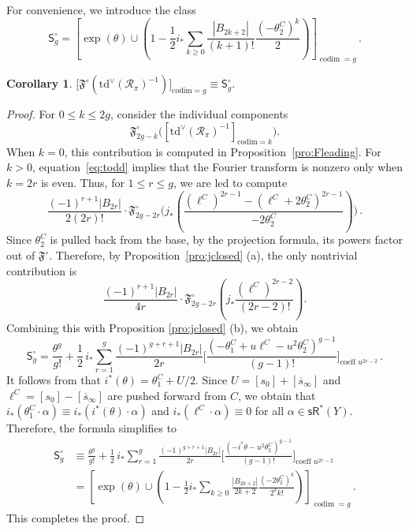 \documentclass[11pt]{article}
\def\sR{\mathsf{sR}}
\def\codim{\mathrm{codim}}
\def\Td{\mathrm{td}}
\def\fm{\mathfrak{F}}
\def\cR{\mathcal{R}}
\newcommand{\sfS}{\mathsf{S}}
\newcommand{\sbar}{\overline{s}}
\theoremstyle{definition}
\newtheorem{corollary}[definition]{Corollary}
\begin{document}
For convenience, we introduce the class
\[
\sfS_g^\circ = \left[ \exp(\theta) \cup \left(1 - \frac{1}{2}i_*\sum_{k\geq 0}\frac{|B_{2k+2}|}{(k+1)!}\frac{(-\theta_2^C)^k}{2}\right)\right]_{\operatorname{codim}=g}\,.
\]
\begin{corollary}\label{cor:Fleading2}
    $\big[\fm^\circ(\Td^\vee(\cR_\pi)^{-1})\big]_{\codim =g} \equiv \sfS_g^\circ$.
\end{corollary}
\begin{proof}
    For $0 \le k \le 2g$, consider the individual components
    \[
    \fm^\circ_{2g-k}\Big([\Td^\vee(\cR_\pi)^{-1}]_{\codim = k}\Big).
    \]
    When $k = 0$, this contribution is computed in Proposition~\ref{pro:Fleading}. For $k > 0$, equation~\eqref{eq:todd} implies that the Fourier transform is nonzero only when $k = 2r$ is even. Thus, for $1 \le r \le g$, we are led to compute
    \[
    \frac{(-1)^{r+1}|B_{2r}|}{2(2r)!} \cdot \fm^\circ_{2g-2r}\Bigg(j_*\!\left(
    \frac{(\ell^C)^{2r-1} - (\ell^C + 2\theta_2^C)^{2r-1}}{-2\theta_2^C}\right)\Bigg)\,.
    \]
    Since $\theta_2^C$ is pulled back from the base, by the projection formula, its powers factor out of $\fm^\circ$. Therefore, by Proposition~\ref{pro:jclosed} (a), the only nontrivial contribution is
    \[
    \frac{(-1)^{r+1} |B_{2r}|}{4r}\cdot \fm^\circ_{2g-2r}\left(j_*\frac{(\ell^C)^{2r-2}}{(2r-2)!}\right).
    \]
    Combining this with Proposition \ref{pro:jclosed} (b), we obtain
    \[
    \sfS_g^\circ
    =
    \frac{\theta^g}{g!}
    +
    \frac{1}{2}\, i_*
    \sum_{r=1}^g
    \frac{(-1)^{g+r+1}|B_{2r}|}{2r}
    \Bigg[\frac{(-\theta_1^C + u\ell^C -u^2\theta_2^C)^{g-1}}{(g-1)!}\Bigg]_{\text{coeff } u^{2r-2}}\,.
    \]
    It follows from \cite[Proposition 4.5]{EGH10} that $
    i^*(\theta) = \theta_1^C+U/2$. Since $U=[s_0]+[\sbar_{\infty }]$ and $\ell^{C}=[s_0]-[\sbar_{\infty }]$ are pushed forward from $C$, we obtain that $i_{\ast}(\theta_1^{C}\cdot \alpha)\equiv i_{\ast}(i^{\ast}(\theta)\cdot \alpha)$ and $i_{\ast}(\ell^{C}\cdot \alpha)\equiv 0$ for all $\alpha\in \sR^{\ast}(Y)$.
    Therefore, the formula simplifies to
    \begin{align*}
    \mathsf{S}_g^\circ &\equiv \frac{\theta^g}{g!}
    +
    \frac{1}{2}\, i_*
    \sum_{r=1}^g
    \frac{(-1)^{g+r+1}|B_{2r}|}{2r}
    \Bigg[\frac{(-i^*\theta -u^2\theta_2^C)^{g-1}}{(g-1)!}\Bigg]_{\text{coeff } u^{2r-2}}\\
    &=\left[ \exp(\theta)\cup\left(1 - \frac{1}{2}i_*\sum_{k\geq 0}\frac{|B_{2k+2}|}{2k+2}\frac{(-2\theta_2^C)^k}{2^kk!}\right)\right]_{\operatorname{codim}=g}\,.
    \end{align*}
    This completes the proof.
\end{proof}
\end{document}
